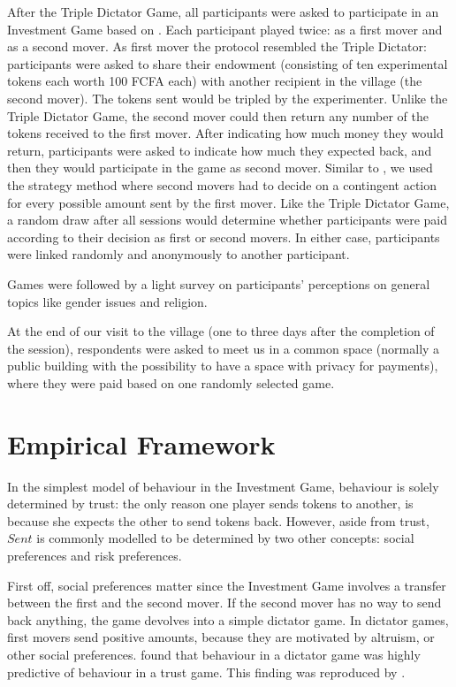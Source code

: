 After the Triple Dictator Game, all participants were asked to participate in an Investment Game based on \cite{Berg1995}. Each participant played twice: as a first mover and as a second mover. As first mover the protocol resembled the Triple Dictator: participants were asked to share their endowment (consisting of ten experimental tokens each worth 100 FCFA each) with another recipient in the village (the second mover). The tokens sent would be tripled by the experimenter. Unlike the Triple Dictator Game, the second mover could then return any number of the tokens received to the first mover. After indicating how much money they would return, participants were asked to indicate how much they expected back, and then they would participate in the game as second mover. Similar to \cite{Ashraf2006}, we used the strategy method where second movers had to decide on a contingent action for every possible amount sent by the first mover. Like the Triple Dictator Game, a random draw after all sessions would determine whether participants were paid according to their decision as first or second movers. In either case, participants were linked randomly and anonymously to another participant.

Games were followed by a light survey on participants' perceptions on general topics like gender issues and religion.

At the end of our visit to the village (one to three days after the completion of the session), respondents were asked to meet us in a common space (normally a public building with the possibility to have a space with privacy for payments), where they were paid based on one randomly selected game.


\section{Empirical Framework}
In the simplest model of behaviour in the Investment Game, behaviour is solely determined by trust: the only reason one player sends tokens to another, is because she expects the other to send tokens back. However, aside from trust, $Sent$  is commonly modelled to be determined by two other concepts: social preferences and risk preferences. 

First off, social preferences matter since the Investment Game involves a transfer between the first and the second mover. If the second mover has no way to send back anything, the game devolves into a simple dictator game. In dictator games, first movers send positive amounts, because they are motivated by altruism, or other social preferences. \cite{Cox2004} found that behaviour in a dictator game was highly predictive of behaviour in a trust game. This finding was reproduced by \citep{Ashraf2006}.

